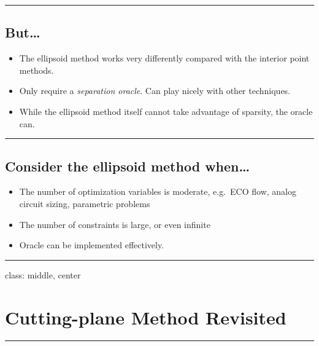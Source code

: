 \documentclass[
]{article}
\begin{document}
\begin{center}\rule{0.5\linewidth}{0.5pt}\end{center}

\subsection{But\ldots{}}\label{but}

\begin{itemize}
\item
  The ellipsoid method works very differently compared with the interior
  point methods.
\item
  Only require a \emph{separation oracle}. Can play nicely with other
  techniques.
\item
  While the ellipsoid method itself cannot take advantage of sparsity,
  the oracle can.
\end{itemize}

\begin{center}\rule{0.5\linewidth}{0.5pt}\end{center}

\subsection{Consider the ellipsoid method
when\ldots{}}\label{consider-the-ellipsoid-method-when}

\begin{itemize}
\item
  The number of optimization variables is moderate, e.g.~ECO flow,
  analog circuit sizing, parametric problems
\item
  The number of constraints is large, or even infinite
\item
  Oracle can be implemented effectively.
\end{itemize}

\begin{center}\rule{0.5\linewidth}{0.5pt}\end{center}

class: middle, center

\section{Cutting-plane Method
Revisited}\label{cutting-plane-method-revisited}

\begin{center}\rule{0.5\linewidth}{0.5pt}\end{center}
\end{document}
